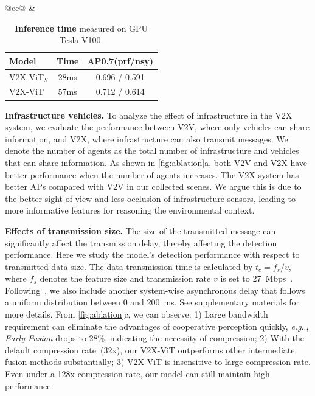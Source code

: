 \documentclass[runningheads]{llncs}
\makeatletter
\DeclareRobustCommand\onedot{\futurelet\@let@token\@onedot}
\def\@onedot{\ifx\@let@token.\else.\null\fi\xspace}
\def\eg{\emph{e.g}\onedot} \def\Eg{\emph{E.g}\onedot}
\makeatother
\begin{document}
\begin{table}[!t]
\begin{tabular}{@{}cc@{}}
&
\hspace{3mm}
\begin{minipage}[t]{0.4\textwidth}
\centering
\scriptsize
\setlength{\tabcolsep}{3pt}
\renewcommand{\arraystretch}{1.0}
\caption{\textbf{Inference time} measured on GPU Tesla V100.}
\label{tbl:time}
\begin{tabular}{lcc}
 \cellcolor{lightgray} Model &  \cellcolor{lightgray} Time &  \cellcolor{lightgray} AP0.7(prf/nsy) \\
 \toprule
 V2X-ViT$_S$ & 28ms & 0.696 / 0.591 \\
 V2X-ViT & 57ms & 0.712 / 0.614 \\
 \bottomrule
\end{tabular}
\end{minipage}%
\end{tabular}
\vspace{-4mm}
\end{table}

\noindent\textbf{Infrastructure \vs vehicles. }To analyze the effect of infrastructure in the V2X system, we evaluate the performance between V2V, where only vehicles can share information, and V2X, where infrastructure can also transmit messages. We denote the number of agents as the total number of infrastructure and vehicles that can share information.
As shown in \cref{fig:ablation}a, both V2V and V2X have better performance when the number of agents increases. The V2X system has better APs compared with V2V in our collected scenes. We argue this is due to the better sight-of-view and less occlusion of infrastructure sensors, leading to more informative features for reasoning the environmental context. 

\noindent\textbf{Effects of transmission size.}
The size of the transmitted message can significantly affect the transmission delay, thereby affecting the detection performance. Here we study the model's detection performance with respect to transmitted data size. The data transmission time is calculated by  $t_c = f_s/v $,  where $f_s$ denotes the feature size and transmission rate $v$ is set to 27~Mbps~\cite{arena2019overview}.  Following~\cite{rauch2011analysis}, we also include another system-wise asynchronous delay that follows a uniform distribution between 0 and 200~ms. See supplementary materials for more details.  From \cref{fig:ablation}c, we can observe: 1) Large bandwidth requirement can eliminate the advantages of cooperative perception quickly, \eg, \textit{Early Fusion} drops to 28\%, indicating the necessity of compression; 2) With the default compression rate~(32x), our V2X-ViT outperforms other intermediate fusion methods substantially; 3) V2X-ViT is insensitive to large compression rate. Even under a 128x compression rate, our model can still maintain high performance.
\end{document}
